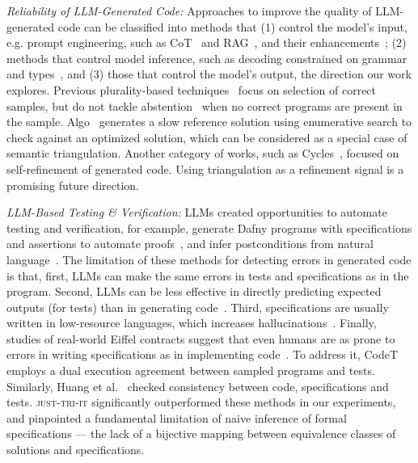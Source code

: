\documentclass[acmsmall,screen,nonacm]{acmart}
\newcommand{\toolName}{\textsc{just-tri-it}\xspace}
\begin{document}
\textit{Reliability of LLM-Generated Code:} Approaches to improve the quality of LLM-generated code can be classified into methods that (1) control the model's input, e.g. prompt engineering, such as CoT~\cite{wei2022chain} and RAG~\cite{lewis2020retrieval}, and their enhancements~\cite{li2025structured}; (2) methods that control model inference, such as decoding constrained on grammar~\cite{park2024grammar} and types~\cite{mundler2025type}, and (3) those that control the model's output, the direction our work explores. Previous plurality-based techniques~\cite{shi2022natural,fan2024oracle} focus on selection of correct samples, but do not tackle abstention~\cite{kim2025correlated} when no correct programs are present in the sample. Algo~\cite{zhang2023algo} generates a slow reference solution using enumerative search to check against an optimized solution, which can be considered as a special case of semantic triangulation. Another category of works, such as Cycles~\cite{ding2024cycle}, focused on self-refinement of generated code. Using triangulation as a refinement signal is a promising future direction.

\textit{LLM-Based Testing \& Verification:} LLMs created opportunities to automate testing and verification, for example, generate Dafny programs with specifications and assertions to automate proofs~\cite{misu2024towards,mugnier2025laurel}, and infer postconditions from natural language~\cite{endres2024can,ma2024specgen}. The limitation of these methods for detecting errors in generated code is that, first, LLMs can make the same errors in tests and specifications as in the program. Second, LLMs can be less effective in directly predicting expected outputs (for tests) than in generating code~\cite{gao2023pal,bouras2025hoareprompt}. Third, specifications are usually written in low-resource languages, which increases hallucinations~\cite{li2025language}. Finally, studies of real-world Eiffel contracts suggest that even humans are as prone to errors in writing specifications as in implementing code~\cite{ciupa2011number}. To address it, CodeT~\cite{chen2022codet} employs a dual execution agreement between sampled programs and tests. Similarly, Huang et al.~\cite{huang2023enhancing} checked consistency between code, specifications and tests. \toolName significantly outperformed these methods in our experiments, and pinpointed a fundamental limitation of naive inference of formal specifications --- the lack of a bijective mapping between equivalence classes of solutions and specifications.
\end{document}
